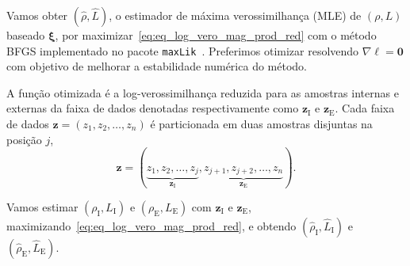 %
%


Vamos obter $(\widehat \rho, \widehat L)$, o estimador de máxima verossimilhança (MLE) de $(\rho, L)$ baseado $\bm \xi$, por maximizar~\eqref{eq:eq_log_vero_mag_prod_red} com o método BFGS implementado no pacote \texttt{maxLik}~\citep{ht}. Preferimos otimizar resolvendo $\nabla\ell=\bm 0$ com objetivo de melhorar a estabilidade numérica do método.

A função otimizada é a log-verossimilhança reduzida para as amostras internas e externas da faixa de dados denotadas respectivamente como $\bm z_\text{I}$ e $\bm z_\text{E}$. Cada faixa de dados $\bm z = (z_1,z_2,\dots,z_n)$ é particionada em duas amostras disjuntas na posição $j$,  
$$
\bm z = (\underbrace{z_1,z_2,\dots,z_j}_{\bm z_\text{I}}, 
\underbrace{z_{j+1}, z_{j+2},\dots,z_n}_{\bm z_\text{E}}).
$$

Vamos estimar $(\rho_\text{I},L_\text{I})$ e $(\rho_\text{E},L_\text{E})$ com $\bm z_\text{I}$ e $\bm z_\text{E}$, maximizando~\eqref{eq:eq_log_vero_mag_prod_red}, e obtendo $(\widehat{\rho}_\text{I}, \widehat{L}_\text{I})$ e $(\widehat{\rho}_\text{E}, \widehat{L}_\text{E})$.

